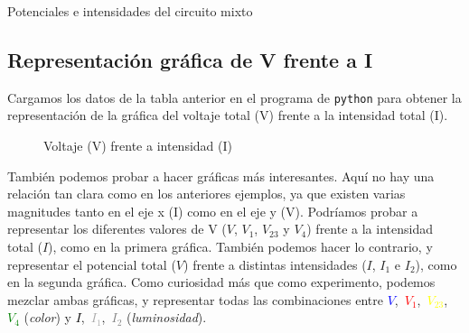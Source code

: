 \documentclass[12pt, a4paper, titlepage]{article}
\newcommand{\code}[1]{\texttt{#1}} %
\begin{document}
  \begin{table}[H]
  \centering
  \caption{Potenciales e intensidades del circuito mixto}
  \end{table}

  \subsection{Representación gráfica de V frente a I}

  Cargamos los datos de la tabla anterior en el programa de \code{python} para obtener la representación de la gráfica del voltaje total (V) frente a la intensidad total (I).

  \begin{figure}[H]
    \hspace{2.5em} 
    \caption{Voltaje (V) frente a intensidad (I)}
    \label{graf:cmixinttotal}
  \end{figure}

  También podemos probar a hacer gráficas más interesantes. Aquí no hay una relación tan clara como en los anteriores ejemplos, ya que existen varias magnitudes tanto en el eje x (I) como en el eje y (V). Podríamos probar a representar los diferentes valores de V ($V$, $V_1$, $V_{23}$ y $V_4$) frente a la intensidad total ($I$), como en la primera gráfica. También podemos hacer lo contrario, y representar el potencial total ($V$) frente a distintas intensidades ($I$, $I_1$ e $I_2$), como en la segunda gráfica. Como curiosidad más que como experimento, podemos mezclar ambas gráficas, y representar todas las combinaciones entre \textcolor{Blue}{$V$},~\textcolor{Red}{$V_1$},~\textcolor{Yellow}{$V_{23}$},~\textcolor{Green}{$V_4$} (\textit{color}) y \textcolor{Black}{$I$},~\textcolor{DarkGrey}{$I_1$},~\textcolor{Grey}{$I_2$} (\textit{luminosidad}).
\end{document}
